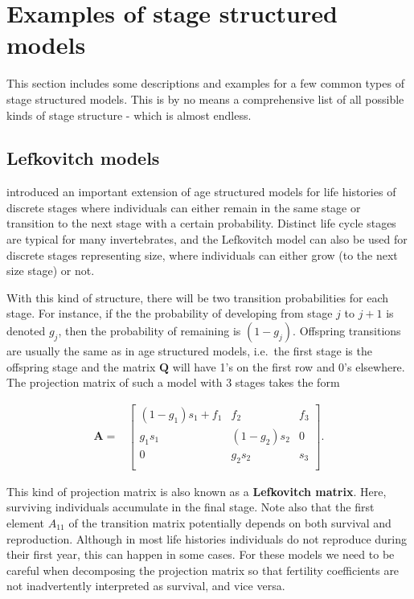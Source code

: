 \documentclass[
]{book}
\begin{document}
\hypertarget{examples-of-stage-structured-models}{%
\section{Examples of stage structured models}\label{examples-of-stage-structured-models}}

This section includes some descriptions and examples for a few common types of stage structured models. This is by no means a comprehensive list of all possible kinds of stage structure - which is almost endless.

\hypertarget{lefkovitch-models}{%
\subsection{Lefkovitch models}\label{lefkovitch-models}}

\citet{Lefkovitch1} introduced an important extension of age structured models for life histories of discrete stages where individuals can either remain in the same stage or transition to the next stage with a certain probability.
Distinct life cycle stages are typical for many invertebrates, and the Lefkovitch model can also be used for discrete stages representing size, where individuals can either grow (to the next size stage) or not.

With this kind of structure, there will be two transition probabilities for each stage. For instance, if the the probability of developing from stage \(j\) to \(j+1\) is denoted \(g_j\), then the probability of remaining is \((1-g_j)\). Offspring transitions are usually the same as in age structured models, i.e.~the first stage is the offspring stage and the matrix \(\mathbf{Q}\) will have 1's on the first row and 0's elsewhere. The projection matrix of such a model with 3 stages takes the form

\begin{align}
\mathbf{A}=&\left[\begin{matrix} 
(1-g_{1}) s_1+ f_1  &  f_2 &   f_3\\ 
g_{1}s_1   & (1-g_{2})s_2  & 0 \\ 
0   & g_{2}s_2  &  s_3 \\ 
\end{matrix}\right].
\label{eq:Lefkovitch}
\end{align}

This kind of projection matrix is also known as a \textbf{Lefkovitch matrix}. Here, surviving individuals accumulate in the final stage. Note also that the first element \(A_{11}\) of the transition matrix potentially depends on both survival and reproduction. Although in most life histories individuals do not reproduce during their first year, this can happen in some cases. For these models we need to be careful when decomposing the projection matrix so that fertility coefficients are not inadvertently interpreted as survival, and vice versa.
\end{document}
